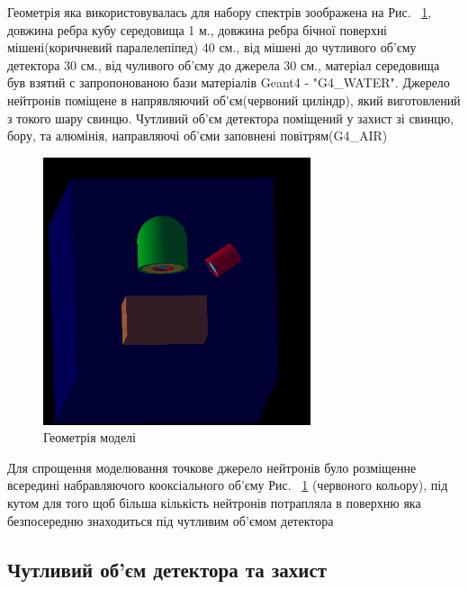 \documentclass[a4paper, 14pt]{article}
\numberwithin{equation}{section}
\numberwithin{table}{section}
\begin{document}
Геометрія яка використовувалась для набору спектрів зоображена на Рис. ~\ref{ris:Geometry}, довжина ребра кубу середовища 1 м., довжина ребра бічної поверхні мішені(коричневий паралелепіпед) 40 см., від мішені до чутливого об'єму детектора 30 см., від чуливого об'єму до джерела 30 см., матеріал середовища був взятий с запропонованою бази матеріалів Geant4 - "G4\_WATER". Джерело нейтронів поміщене в напрявляючий об'єм(червоний циліндр), який виготовлений з токого шару свинцю. Чутливий об'єм детектора поміщений у захист зі свинцю, бору, та алюмінія, направляючі об'єми заповнені повітрям(G4\_AIR)
\begin{figure}[hbt!]
	\centering \includegraphics[width=0.7\textwidth]{images/geometryAll.png}
	\caption{Геометрія моделі} 
	\label{ris:Geometry}	
\end{figure}

Для спрощення моделювання точкове джерело нейтронів було розміщенне всередині набравляючого кооксіального об'єму Рис. ~\ref{ris:Geometry} (червоного кольору), під кутом для того щоб більша кількість нейтронів потрапляла в поверхню яка безпосередню знаходиться під чутливим об'ємом детектора 


\subsection{Чутливий об'єм детектора та захист}
	
\end{document}
